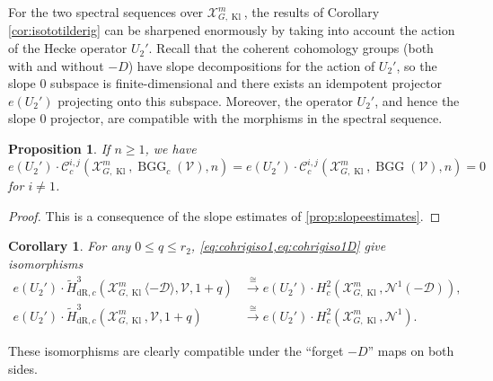 \documentclass[cjm]{ipart}
\theoremstyle{plain}
\newtheorem{proposition}[theorem]{Proposition}
\newtheorem{corollary}[theorem]{Corollary}
\theoremstyle{remark}
\DeclareMathOperator{\BGG}{BGG}
\DeclareMathOperator{\Kl}{Kl}
\newcommand{\cD}{\mathcal{D}}
\newcommand{\cN}{\mathcal{N}}
\newcommand{\cV}{\mathcal{V}}
\newcommand{\cX}{\mathcal{X}}
\newcommand{\dR}{\mathrm{dR}}
\newcommand{\sC}{\mathscr{C}}
\newcommand{\wH}{\widetilde{H}}
\numberwithin{equation}{subsection}
\renewcommand{\le}{\leqslant}
\renewcommand{\ge}{\geqslant}
\begin{document}
   For the two spectral sequences over $\cX_{G,\Kl}^m$, the results of Corollary \ref{cor:isototilderig} can be sharpened enormously by taking into account the action of the Hecke operator $U_2'$. Recall that the coherent cohomology groups (both with and without $-D$) have slope decompositions for the action of $U_2'$, so the slope 0 subspace is finite-dimensional and there exists an idempotent projector $e(U_2')$ projecting onto this subspace. Moreover, the operator $U_2'$, and hence the slope 0 projector, are compatible with the morphisms in the spectral sequence.

  \begin{proposition}
   If $n \ge 1$, we have
   \[ e(U_2') \cdot \sC^{i,j}_c(\cX_{G,\Kl}^m,\BGG_c(\cV), n) = e(U_2') \cdot \sC^{i,j}_c(\cX_{G,\Kl}^m,\BGG(\cV), n) = 0\]
   for $i \ne 1$.
  \end{proposition}


  \begin{proof}
   This is a consequence of the slope estimates of \cref{prop:slopeestimates}.
  \end{proof}

  \begin{corollary}
   For any $0 \le q \le r_2$, \cref{eq:cohrigiso1,eq:cohrigiso1D} give isomorphisms
   \begin{subequations}
    \begin{align}
    e(U_2') \cdot \wH^{3}_{\dR,c}(\cX_{G,\Kl}^m\langle -\cD\rangle,\cV,1+q)
    &\xrightarrow{\,\cong\,}  e(U_2') \cdot H_c^2\left(\cX_{G,\Kl}^m,\cN^1(-\cD)\right),\label{eq:cohrigiso-ordD}\\
    e(U_2') \cdot \wH^{3}_{\dR,c}(\cX_{G,\Kl}^m,\cV,1+q)
    &\xrightarrow{\,\cong\,}  e(U_2') \cdot H_c^2\left(\cX_{G,\Kl}^m,\cN^1\right).
    \end{align}
   \end{subequations}
  \end{corollary}

  \begin{remark}
   These isomorphisms are clearly compatible under the ``forget $-D$'' maps on both sides.
  \end{remark}
\end{document}
